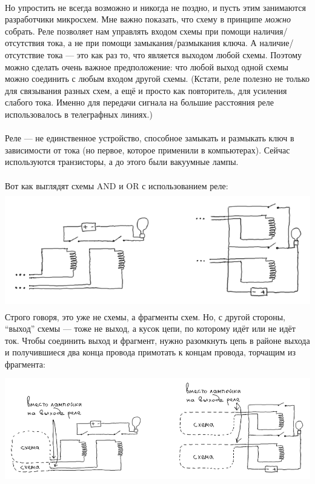 \documentclass[11pt]{book}
\begin{document}
\\
Но упростить не всегда возможно и никогда не поздно, и пусть этим занимаются разработчики микросхем.
Мне важно показать, что схему в принципе \emph{можно} собрать. Реле позволяет нам управлять входом схемы при помощи наличия/отсутствия тока,
а не при помощи замыкания/размыкания ключа. А наличие/отсутствие тока --- это как раз то,
что является выходом любой схемы. Поэтому можно сделать очень
важное предположение: что любой выход одной схемы можно соединить с любым входом другой
схемы. (Кстати, реле полезно не только для связывания разных схем, а ещё и просто как повторитель, для усиления слабого тока.
Именно для передачи сигнала на большие расстояния реле использовалось в телеграфных линиях.)
\\ \\
Реле --- не единственное устройство, способное замыкать и размыкать ключ
в зависимости от тока (но первое, которое применили в компьютерах). Сейчас
используются транзисторы, а до этого были вакуумные лампы.
\\ \\
Вот как выглядят схемы AND и OR с использованием реле:
\\
\includegraphics[height=2in]{pic/15.png}
\\
Строго говоря, это уже не схемы, а фрагменты схем. Но, с другой стороны, ``выход'' схемы ---
тоже не выход, а кусок цепи, по которому идёт или не идёт ток. Чтобы соединить выход
и фрагмент, нужно разомкнуть цепь в районе выхода и получившиеся два конца провода примотать
к концам провода, торчащим из фрагмента:
\\
\includegraphics[height=2in]{pic/16.png}
\end{document}
